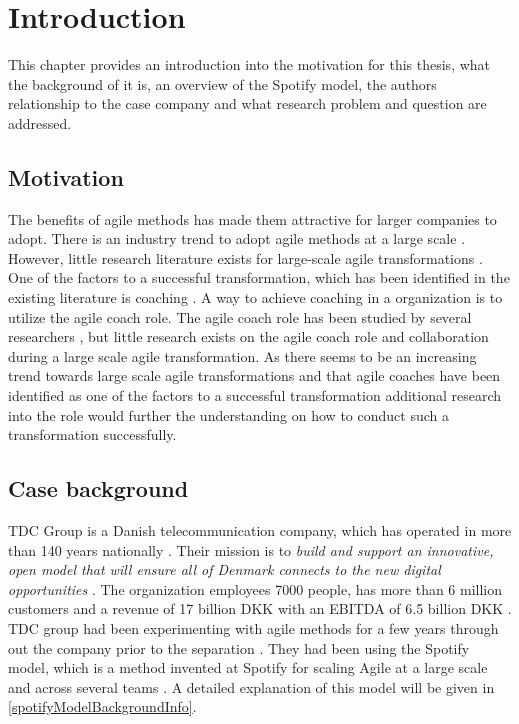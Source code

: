 \documentclass[11pt,a4paper]{report}
\begin{document}
\newpage

\tableofcontents

\newpage

\chapter{Introduction}
This chapter provides an introduction into the motivation for this thesis, what the background of it is, an overview of the Spotify model, the authors relationship to the case company and what research problem and question are addressed.

\section{Motivation}
The benefits of agile methods has made them attractive for larger companies to adopt. There is an industry trend to adopt agile methods at a large scale \cite{dikert2016challenges}. However, little research literature exists for large-scale agile transformations \cite{paasivaara2018large}. One of the factors to a successful transformation, which has been identified in the existing literature is coaching \cite{dikert2016challenges} \cite{paasivaara2018large} \cite{uludag2018identifying}. A way to achieve coaching in a organization is to utilize the agile coach role. The agile coach role has been studied by several researchers \cite{litReviewACRole} \cite{althoff2019qualitative} \cite{stray2020agile} \cite{parizi2014hidden}, but little research exists on the agile coach role and collaboration during a large scale agile transformation. As there seems to be an increasing trend towards large scale agile transformations and that agile coaches have been identified as one of the factors to a successful transformation additional research into the role would further the understanding on how to conduct such a transformation successfully.

\section{Case background}
TDC Group is a Danish telecommunication company, which has operated in more than 140 years nationally \cite{tdcHistory}. Their mission is to \textit{build and support an innovative, open model that will ensure all of Denmark connects to the new digital opportunities} \cite{tdcHistory}. The organization employees 7000 people, has more than 6 million customers and a revenue of 17 billion DKK with an EBITDA of 6.5 billion DKK \cite{tdcGroupAnnualReport}. TDC group had been experimenting with agile methods for a few years through out the company prior to the separation \cite{HenrikNuudayPresentation}. They had been using the Spotify model, which is a method invented at Spotify for scaling Agile at a large scale and across several teams  \cite{spotifyMethod}. A detailed explanation of this model will be given in \autoref{spotifyModelBackgroundInfo}.
\end{document}
